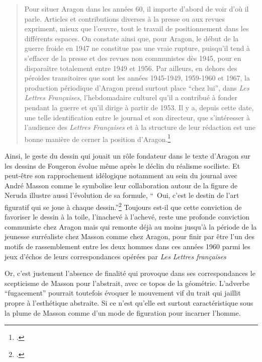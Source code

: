 \begin{quote}
Pour situer Aragon dans les années 60, il importe d'abord de voir d'où il parle. Articles et contributions diverses à la presse ou aux revues expriment, mieux que l'\oe{}uvre, tout le travail de positionnement dans les différents espaces. On constate ainsi que, pour Aragon, le début de la guerre froide en 1947 ne constitue pas une vraie rupture, puisqu'il tend à s'effacer de la presse et des revues non communistes dès 1945, pour en disparaître totalement entre 1949 et 1956. Par ailleurs, en dehors des péroides transitoires que sont les années 1945-1949, 1959-1960 et 1967, la production périodique d'Aragon prend surtout place \enquote{chez lui}, dans \emph{Les Lettres Françaises}, l'hebdomadaire culturel qu'il a contribué à fonder pendant la guerre et qu'il dirige à partir de 1953. Il y a, depuis cette date, une telle identification entre le journal et son directeur, que s'intéresser à l'audience des \emph{Lettres Françaises} et à la structure de leur rédaction est une bonne manière de cerner la position d'Aragon.\footcite{sensdujeu}
\end{quote}


Ainsi, le geste du dessin qui jouait un rôle fondateur dans le texte d'Aragon sur les dessins de Fougeron évolue même après le déclin du réalisme sociliste. Et peut-être son rapprochement idélogique notamment au sein du journal avec André Masson comme le symbolise leur collaboration autour de la figure de Neruda illustre aussi l'évolution de sa formule, \enquote{ Oui, c’est le destin de l’art figuratif qui se joue à chaque dessin.}\footcite[p135]{ecritssurla} Toujours est-il que cette conviction de favoriser le dessin à la toile, l'inachevé à l'achevé, reste une profonde conviction communiste chez Aragon mais qui remonte déjà au moins jusqu'à la période de la jeunesse surréaliste chez Masson comme chez Aragon, pour finir par être l'un des motifs de rassemblement entre les deux hommes dans ces années 1960 parmi les jeux d'échos de leurs correspondances opérées par \emph{Les Lettres françaises}

	Or, c’est justement l’absence de finalité qui provoque dans ses correspondances le scepticisme de Masson pour l’abstrait, avec ce topos  de la géométrie. L’adverbe \enquote{fugacement} pourrait toutefois évoquer le mouvement vif du trait qui jaillit propre à l’esthétique abstraite. Si ce n’est qu’elle est surtout caractéristique sous la plume de Masson comme d’un mode de figuration pour incarner l’homme. 

